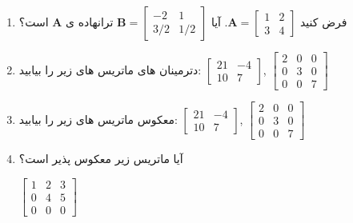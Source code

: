 {\begin{spacing}{1.5}
\begin{enumerate}[label=\textbf{\arabic*}.]
            \item {فرض کنید $\textbf{A}=\begin{bmatrix}
                                            1 & 2 \\
                                            3 & 4
            \end{bmatrix}$. آیا $\textbf{B}=\begin{bmatrix}
                                                -2  & 1   \\
                                                3/2 & 1/2
            \end{bmatrix}$ ترانهاده ی $\textbf{A}$ است؟
            }

            \item {دترمینان های ماتریس های زیر را بیابید:
                $\begin{bmatrix}
                     21 & -4 \\
                     10 & 7
                \end{bmatrix}$,
                $\begin{bmatrix}
                     2 & 0 & 0 \\
                     0 & 3 & 0 \\
                     0 & 0 & 7
                \end{bmatrix}$
            }

            \item {معکوس ماتریس های زیر را بیابید:
                $\begin{bmatrix}
                     21 & -4 \\
                     10 & 7
                \end{bmatrix}$,
                $\begin{bmatrix}
                     2 & 0 & 0 \\
                     0 & 3 & 0 \\
                     0 & 0 & 7
                \end{bmatrix}$
            }

            \item {آیا ماتریس زیر معکوس پذیر است؟
                \begin{center}
                    $\begin{bmatrix}
                         1 & 2 & 3 \\
                         0 & 4 & 5 \\
                         0 & 0 & 0
                    \end{bmatrix}$
                \end{center}
            }


\end{enumerate}
\end{spacing}}
